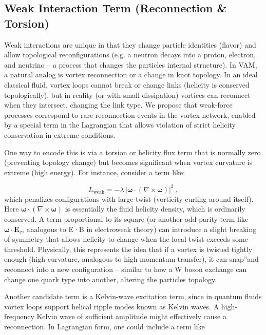 \subsection{Weak Interaction Term (Reconnection \& Torsion)}

Weak interactions are unique in that they change particle identities (flavor) and allow topological reconfigurations (e.g. a neutron decays into a proton, electron, and neutrino – a process that changes the particle\rqs s internal structure). In VAM, a natural analog is vortex reconnection or a change in knot topology. In an ideal classical fluid, vortex loops cannot break or change links (helicity is conserved topologically), but in reality (or with small dissipation) vortices can reconnect when they intersect, changing the link type. We propose that weak-force processes correspond to rare reconnection events in the vortex network, enabled by a special term in the Lagrangian that allows violation of strict helicity conservation in extreme conditions.


One way to encode this is via a torsion or helicity flux term that is normally zero (preventing topology change) but becomes significant when vortex curvature is extreme (high energy). For instance, consider a term like:

\[
    L_{\text{weak}} = -\lambda \, |\mathbf{\omega} \cdot (\nabla \times \mathbf{\omega})|^2 ~,
\]
which penalizes configurations with large twist (vorticity curling around itself). Here $\mathbf{\omega} \cdot (\nabla \times \mathbf{\omega})$ is essentially the fluid helicity density, which is ordinarily conserved. A term proportional to its square (or another odd-parity term like $\mathbf{\omega}\cdot\mathbf{E}_v$, analogous to E·B in electroweak theory) can introduce a slight breaking of symmetry that allows helicity to change when the local twist exceeds some threshold. Physically, this represents the idea that if a vortex is twisted tightly enough (high curvature, analogous to high momentum transfer), it can \grqq snap\textquotedblright and reconnect into a new configuration – similar to how a W boson exchange can change one quark type into another, altering the particle\rqs s topology.


Another candidate term is a Kelvin-wave excitation term, since in quantum fluids vortex loops support helical ripple modes known as Kelvin waves. A high-frequency Kelvin wave of sufficient amplitude might effectively cause a reconnection. In Lagrangian form, one could include a term like

